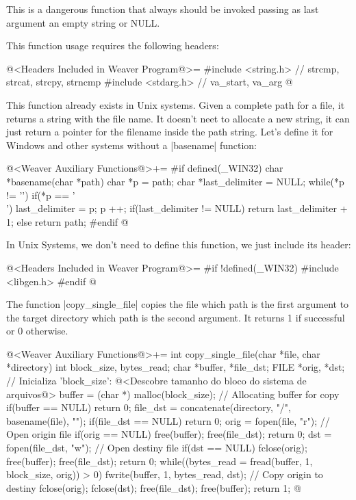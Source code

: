 This is a dangerous function that always should be invoked passing as
last argument an empty string or NULL.

This function usage requires the following headers:

\iniciocodigo
@<Headers Included in Weaver Program@>=
#include <string.h> // strcmp, strcat, strcpy, strncmp
#include <stdarg.h> // va_start, va_arg
@
\fimcodigo


This function already exists in Unix systems. Given a complete path
for a file, it returns a string with the file name. It doesn't neet to
allocate a new string, it can just return a pointer for the filename
inside the path string. Let's define it for Windows and other systems
without a |basename| function:

\iniciocodigo
@<Weaver Auxiliary Functions@>+=
#if defined(_WIN32)
char *basename(char *path){
  char *p = path;
  char *last_delimiter = NULL;
  while(*p != '\0'){
    if(*p == '\\')
      last_delimiter = p;
    p ++;
  }
  if(last_delimiter != NULL)
    return last_delimiter + 1;
  else
    return path;
}
#endif
@
\fimcodigo


In Unix Systems, we don't need to define this function, we just
include its header:

\iniciocodigo
@<Headers Included in Weaver Program@>=
#if !defined(_WIN32)
#include <libgen.h>
#endif
@
\fimcodigo


The function |copy_single_file| copies the file which path is the
first argument to the target directory which path is the second
argument. It returns 1 if successful or 0 otherwise.

\iniciocodigo
@<Weaver Auxiliary Functions@>+=
int copy_single_file(char *file, char *directory){
  int block_size, bytes_read;
  char *buffer, *file_dst;
  FILE *orig, *dst;
  // Inicializa 'block_size':
  @<Descobre tamanho do bloco do sistema de arquivos@>
  buffer = (char *) malloc(block_size); // Allocating buffer for copy
  if(buffer == NULL) return 0;
  file_dst = concatenate(directory, "/", basename(file), "");
  if(file_dst == NULL) return 0;
  orig = fopen(file, "r"); // Open origin file
  if(orig == NULL){
    free(buffer);
    free(file_dst);
    return 0;
  }
  dst = fopen(file_dst, "w"); // Open destiny file
  if(dst == NULL){
    fclose(orig);
    free(buffer);
    free(file_dst);
    return 0;
  }
  while((bytes_read = fread(buffer, 1, block_size, orig)) > 0){
    fwrite(buffer, 1, bytes_read, dst); // Copy origin to destiny
  }
  fclose(orig);
  fclose(dst);
  free(file_dst);
  free(buffer);
  return 1;
}
@
\fimcodigo


